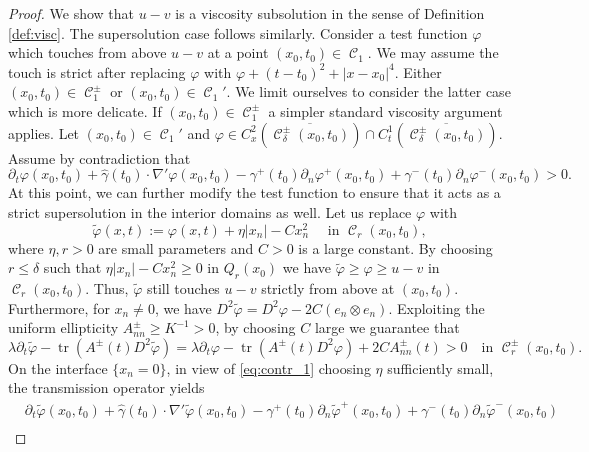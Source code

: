 \documentclass[12pt]{article}
\numberwithin{Theorem}{section}
\theoremstyle{definition}
\theoremstyle{remark}
\numberwithin{equation}{section}
\DeclareMathOperator{\C}{\mathcal{C}}
\DeclareMathOperator*{\tr}{tr}
\newcommand{\p}{\partial}
\begin{document}
\begin{proof}
    We  show that $u-v$ is a viscosity subsolution in the sense of Definition \ref{def:visc}. The supersolution case follows similarly. Consider a test function $\varphi$ which touches from above $u-v$ at a point $(x_0,t_0) \in \C_1$. We may assume the touch is strict after replacing $\varphi$ with $\varphi + (t-t_0)^2 + |x-x_0|^4$. Either $(x_0,t_0) \in \C_1^\pm$ or $(x_0,t_0) \in \C_1'$. We limit ourselves to consider the latter case which is more delicate. If $(x_0,t_0) \in \C_1^\pm$ a simpler standard viscosity argument applies. Let  $(x_0,t_0) \in \C_1'$ and $\varphi \in C_x^{2}(\overline{ \C_\delta^\pm(x_0,t_0)}) \cap  C_t^{1}(\overline{ \C_\delta^\pm(x_0,t_0)})$.
    Assume by contradiction that 
    \begin{equation}\label{eq:contr_1}
            \p_t\varphi(x_0,t_0)  +\hat{\gamma}(t_0) \cdot  \nabla' \varphi(x_0,t_0)  - \gamma^+( t_0) \p_n \varphi^+(x_0,t_0) + \gamma^-(t_0) \p_n \varphi^-(x_0,t_0) >0 . 
    \end{equation}
    At this point, we can further modify the test function to ensure that it acts as a strict supersolution in the interior domains as well. Let us replace $\varphi$ with
    \[
    \tilde{\varphi}(x,t) := \varphi(x,t) + \eta |x_n| - C x_n^2 \quad \text{ in } \C_r(x_0,t_0) ,
    \]
    where $\eta,r > 0$ are small parameters and $C > 0$ is a large constant. By choosing $r \leq \delta$ such that $\eta |x_n| - C x_n^2\geq 0$ in $Q_{r}(x_0)$  we have $\tilde{\varphi} \ge \varphi \ge u-v$ in $\C_{r}(x_0,t_0)$. Thus, $\tilde{\varphi}$ still touches $u-v$ strictly from above at $(x_0,t_0)$. 
    Furthermore, for $x_n \neq 0$, we have  $D^2 \tilde{\varphi} = D^2 \varphi - 2C (e_n \otimes e_n)$. Exploiting the uniform ellipticity $A^\pm_{nn} \ge K^{-1} > 0$, by choosing $C$  large we guarantee that
    \begin{equation} \label{eq:contr_interior}
    \lambda \p_t \tilde{\varphi} - \tr(A^\pm(t) D^2 \tilde{\varphi}) = \lambda \p_t \varphi - \tr(A^\pm(t) D^2 \varphi) + 2C A^\pm_{nn}(t) > 0 \quad \text{in } \C_r^\pm(x_0,t_0).
    \end{equation}
    On the interface $\{x_n = 0\}$, in view of \eqref{eq:contr_1} choosing $\eta$ sufficiently small, the transmission operator yields
    \begin{align*}
            &\p_t\tilde{\varphi}(x_0,t_0)   \!+\!\hat{\gamma}(t_0)  \cdot  \nabla' \tilde{\varphi}(x_0,t_0)  \!-\! \gamma^+(t_0) \p_n \tilde{\varphi}^+(x_0,t_0) \!+\! \gamma^-(t_0) \p_n \tilde{\varphi}^-(x_0,t_0) \\ 

\end{align*}
\end{proof}
\end{document}
